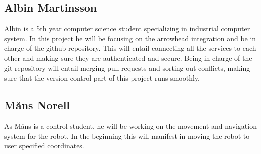 \subsection{Albin Martinsson}
Albin is a 5th year computer science student specializing in industrial computer system. In this project he will be focusing on the 
arrowhead integration and be in charge of the github repository. This will entail connecting all the services to each other and
making sure they are authenticated and secure. Being in charge of the git repository will entail merging pull requests and sorting
out conflicts, making sure that the version control part of this project runs smoothly.

\subsection{Måns Norell}
As Måns is a control student, he will be working on the movement and navigation system for the robot. In the beginning this will manifest in moving the robot to user specified coordinates.

